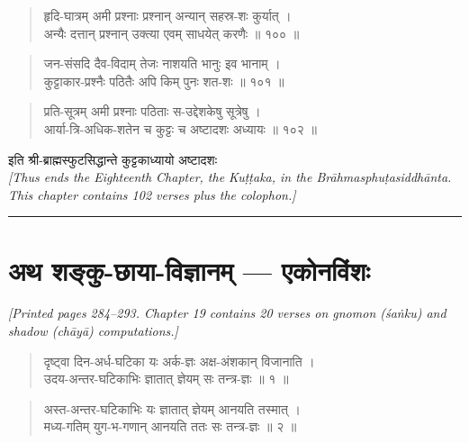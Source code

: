 \documentclass[11pt,a4paper]{article}
\newcommand{\longline}{\noindent\rule{\textwidth}{0.4pt}}
\newcommand{\cnote}[1]{\textcolor{notecolor}{\textit{#1}}}
\newcommand{\dev}[1]{{\devanagarifont #1}}
\newcommand{\dsec}[1]{\section*{\dev{#1}}}
\newenvironment{shloka}{\begin{verse}\devanagarifont\large}{\end{verse}}
\begin{document}
\vspace{0.5cm}

\begin{shloka}
हृदि-घात्रम् अमी प्रश्नाः प्रश्नान् अन्यान् सहस्र-शः कुर्यात् ।\\
अन्यैः दत्तान् प्रश्नान् उक्त्या एवम् साधयेत् करणैः ॥ १०० ॥
\end{shloka}

\begin{shloka}
जन-संसदि दैव-विदाम् तेजः नाशयति भानुः इव भानाम् ।\\
कुट्टाकार-प्रश्नैः पठितैः अपि किम् पुनः शत-शः ॥ १०१ ॥
\end{shloka}

\begin{shloka}
प्रति-सूत्रम् अमी प्रश्नाः पठिताः स-उद्देशकेषु सूत्रेषु ।\\
आर्या-त्रि-अधिक-शतेन च कुट्टः च अष्टादशः अध्यायः ॥ १०२ ॥
\end{shloka}

\vspace{0.5cm}

\begin{center}
\dev{इति श्री-ब्राह्मस्फुटसिद्धान्ते कुट्टकाध्यायो अष्टादशः}\\[0.3cm]
\textit{[Thus ends the Eighteenth Chapter, the Kuṭṭaka, in the
Brāhmasphuṭasiddhānta.\\
This chapter contains 102 verses plus the colophon.]}
\end{center}

\longline
\newpage

\dsec{अथ शङ्कु-छाया-विज्ञानम् — एकोनविंशः}

\cnote{[Printed pages 284–293. Chapter 19 contains 20 verses on gnomon
(śaṅku) and shadow (chāyā) computations.]}

\vspace{0.3cm}

\begin{shloka}
दृष्ट्वा दिन-अर्ध-घटिका यः अर्क-ज्ञः अक्ष-अंशकान् विजानाति ।\\
उदय-अन्तर-घटिकाभिः ज्ञातात् ज्ञेयम् सः तन्त्र-ज्ञः ॥ १ ॥
\end{shloka}

\begin{shloka}
अस्त-अन्तर-घटिकाभिः यः ज्ञातात् ज्ञेयम् आनयति तस्मात् ।\\
मध्य-गतिम् युग-भ-गणान् आनयति ततः सः तन्त्र-ज्ञः ॥ २ ॥
\end{shloka}
\end{document}
